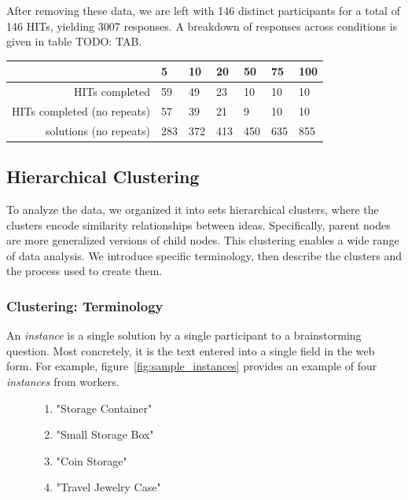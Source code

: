 After removing these data, we are left with 146 distinct participants for a total of 146 HITs, yielding 3007 responses. A breakdown of responses across conditions is given in table TODO: TAB.

\begin{tabular}[h!]{r | l l l l l l }
& 5 & 10 & 20 & 50 & 75 & 100 \\ \hline \hline
HITs completed & 59 & 49 & 23 & 10 & 10 & 10 \\
HITs completed (no repeats) & 57 & 39 & 21 & 9 & 10 & 10 \\
solutions (no repeats) & 283 & 372 & 413 & 450 & 635 & 855 \\
\end{tabular}


\subsection{Hierarchical Clustering}

To analyze the data, we organized it into sets hierarchical clusters, where the clusters encode similarity relationships between ideas. Specifically, parent nodes are more generalized versions of child nodes. This clustering enables a wide range of data analysis. We introduce specific terminology, then describe the clusters and the process used to create them.

\subsubsection{Clustering: Terminology}
An \emph{instance} is a single solution by a single participant to a brainstorming question. Most concretely, it is the text entered into a single field in the web form. For example, figure~\ref{fig:sample_instances} provides an example of four \emph{instances} from workers.

\begin{figure}[!h]
    \begin{enumerate}
        \item "Storage Container"
        \item "Small Storage Box"
        \item "Coin Storage"
        \item "Travel Jewelry Case"
    \end{enumerate}
    \label{sample_instances}
\end{figure}

